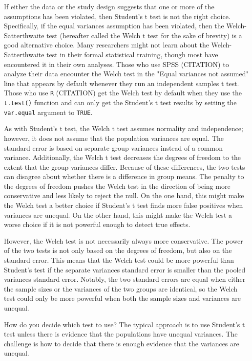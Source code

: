 \documentclass[man,a4paper,noextraspace,apacite]{apa6}\usepackage[]{graphicx}\usepackage[]{color}
\begin{document}
    If either the data or the study design suggests that one or more of the assumptions has been violated, then Student's t test is not the right choice. Specifically, if the equal variances assumption has been violated, then the Welch-Satterthwaite test (hereafter called the Welch t test for the sake of brevity) is a good alternative choice. Many researchers might not learn about the Welch-Satterthwaite test in their formal statistical training, though most have encountered it in their own analyses. Those who use SPSS (CITATION) to analyze their data encounter the Welch test in the "Equal variances not assumed" line that appears by default whenever they run an independent samples t test. Those who use \texttt{R} (CITATION) get the Welch test by default when they use the \texttt{t.test()} function and can only get the Student's t test results by setting the \texttt{var.equal} argument to \texttt{TRUE}.
    
        As with Student's t test, the Welch t test assumes normality and independence; however, it does not assume that the population variances are equal. The standard error is based on separate group variances instead of a common variance. Additionally, the Welch t test decreases the degrees of freedom to the extent that the group variances differ. Because of these differences, the two tests can disagree about whether there is a difference in group means. The penalty to the degrees of freedom pushes the Welch test in the direction of being more conservative and less likely to reject the null. On the one hand, this might make the Welch test a better choice if Student's t test finds more false positives when variances are unequal. On the other hand, this might make the Welch test a worse choice if it is not powerful enough to detect true effects. 
        
    However, the Welch test is not necessarily always more conservative. The power of the two tests is not only based on the degrees of freedom, but also on the standard error. This means that the Welch test could be more powerful than Student's test if the separate variances standard error is smaller than the pooled variances standard error. Notably, the two standard errors are equal when either the sample sizes or the variances of the two groups are identical, so the Welch test could only be more powerful when both the sample sizes and variances are unequal.  
    
    How do you decide which test to use? The typical approach is to use Student's t test unless there is evidence that the populations have unequal variances. The challenge is how to decide that there is enough evidence that the variances are unequal. 
\end{document}
